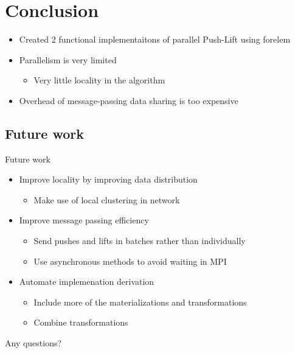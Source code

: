 \documentclass{beamer}
\begin{document}
\section{Conclusion}

\begin{frame}
	\begin{itemize}
		\item Created 2 functional implementaitons of parallel Push-Lift using forelem
		\item Parallelism is very limited
			\begin{itemize}
				\item Very little locality in the algorithm
			\end{itemize}

		\item Overhead of message-passing data sharing is too expensive
	\end{itemize}
\end{frame}

\subsection{Future work}

\begin{frame}{Future work}
	\begin{itemize}
		\item Improve locality by improving data distribution
			\begin{itemize}
				\item Make use of local clustering in network
			\end{itemize}
		\item Improve message passing efficiency
			\begin{itemize}
				\item Send pushes and lifts in batches rather than individually
				\item Use asynchronous methods to avoid waiting in MPI
			\end{itemize}
		\item Automate implemenation derivation
			\begin{itemize}
				\item Include more of the materializations and transformations
				\item Combine transformations
			\end{itemize}
	\end{itemize}
\end{frame}

\appendix
\begin{frame}
	\Huge Any questions?
\end{frame}
\end{document}
